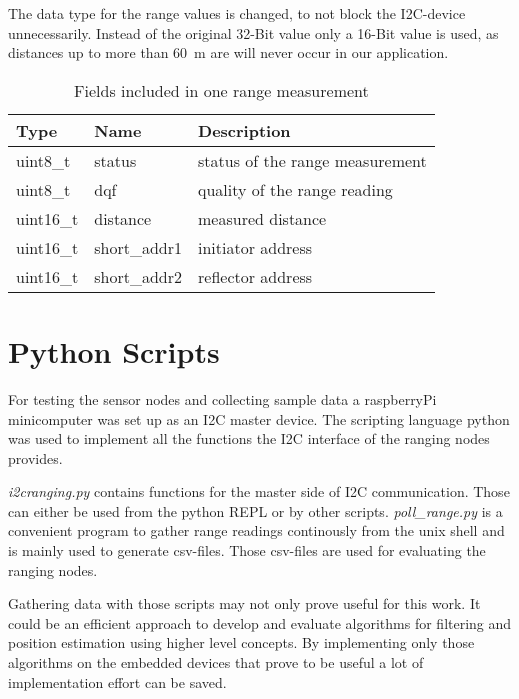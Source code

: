 The data type for the range values is changed, to not block the I2C-device unnecessarily.
Instead of the original 32-Bit value only a 16-Bit value is used, as distances up to more than \SI{60}{\metre} are will never occur in our application.

\begin{table}
	
	\begin{tabularx}{\columnwidth}{l | l | X}
	Type & Name & Description \\ \hline
		uint8\_t  & status       & status of the range measurement \\
		uint8\_t  & dqf          & quality of the range reading \\
		uint16\_t & distance     & measured distance \\
		uint16\_t & short\_addr1 & initiator address \\
		uint16\_t & short\_addr2 & reflector address \\
	\end{tabularx}

	\caption{Fields included in one range measurement}
	\label{rangefields}
	
\end{table}




%
%

\section{Python Scripts}

For testing the sensor nodes and collecting sample data a raspberryPi minicomputer was set up as an I2C master device.
The scripting language python was used to implement all the functions the I2C interface of the ranging nodes provides.

\emph{i2cranging.py} contains functions for the master side of I2C communication. Those can either be used from the python REPL or by other scripts.
\emph{poll\_range.py} is a convenient program to gather range readings continously from the unix shell and is mainly used to generate csv-files.
Those csv-files are used for evaluating the ranging nodes.

Gathering data with those scripts may not only prove useful for this work.
It could be an efficient approach to develop and evaluate algorithms for filtering and position estimation using higher level concepts.
By implementing only those algorithms on the embedded devices that prove to be useful a lot of implementation effort can be saved.



